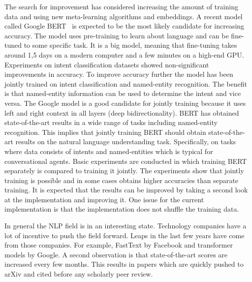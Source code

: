 The search for improvement has considered increasing the amount of training data and using new meta-learning algorithms and embeddings.
A recent model called Google BERT~\citep{devlin2018} is expected to be the most likely candidate for increasing accuracy.
The model uses pre-training to learn about language and can be fine-tuned to some specific task.
It is a big model, meaning that fine-tuning takes around 1,5 days on a modern computer and a few minutes on a high-end GPU.
Experiments on intent classification datasets showed non-significant improvements in accuracy.
To improve accuracy further the model has been jointly trained on intent classification and named-entity recognition.
The benefit is that named-entity information can be used to determine the intent and vice versa.
The Google model is a good candidate for jointly training because it uses left and right context in all layers (deep bidirectionality).
BERT has obtained state-of-the-art results in a wide range of tasks including named-entity recognition.
This implies that jointly training BERT should obtain state-of-the-art results on the natural language understanding task.
Specifically, on tasks where data consists of intents and named-entities which is typical for conversational agents.
Basic experiments are conducted in which training BERT separately is compared to training it jointly.
The experiments show that jointly training is possible and in some cases obtains higher accuracies than separate training.
It is expected that the results can be improved by taking a second look at the implementation and improving it.
One issue for the current implementation is that the implementation does not shuffle the training data.

In general the NLP field is in an interesting state.
Technology companies have a lot of incentive to push the field forward.
Leaps in the last few years have come from those companies.
For example, FastText by Facebook and transformer models by Google.
A second observation is that state-of-the-art scores are increased every few months.
This results in papers which are quickly pushed to arXiv and cited before any scholarly peer review.


